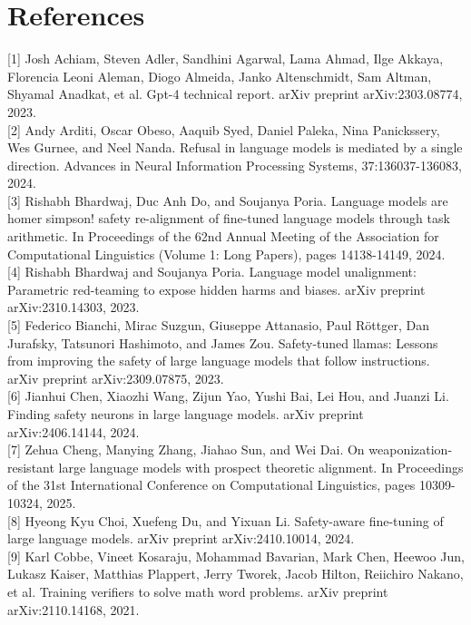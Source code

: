 \documentclass[10pt]{article}
\begin{document}
\section*{References}
[1] Josh Achiam, Steven Adler, Sandhini Agarwal, Lama Ahmad, Ilge Akkaya, Florencia Leoni Aleman, Diogo Almeida, Janko Altenschmidt, Sam Altman, Shyamal Anadkat, et al. Gpt-4 technical report. arXiv preprint arXiv:2303.08774, 2023.\\[0pt]
[2] Andy Arditi, Oscar Obeso, Aaquib Syed, Daniel Paleka, Nina Panickssery, Wes Gurnee, and Neel Nanda. Refusal in language models is mediated by a single direction. Advances in Neural Information Processing Systems, 37:136037-136083, 2024.\\[0pt]
[3] Rishabh Bhardwaj, Duc Anh Do, and Soujanya Poria. Language models are homer simpson! safety re-alignment of fine-tuned language models through task arithmetic. In Proceedings of the 62nd Annual Meeting of the Association for Computational Linguistics (Volume 1: Long Papers), pages 14138-14149, 2024.\\[0pt]
[4] Rishabh Bhardwaj and Soujanya Poria. Language model unalignment: Parametric red-teaming to expose hidden harms and biases. arXiv preprint arXiv:2310.14303, 2023.\\[0pt]
[5] Federico Bianchi, Mirac Suzgun, Giuseppe Attanasio, Paul Röttger, Dan Jurafsky, Tatsunori Hashimoto, and James Zou. Safety-tuned llamas: Lessons from improving the safety of large language models that follow instructions. arXiv preprint arXiv:2309.07875, 2023.\\[0pt]
[6] Jianhui Chen, Xiaozhi Wang, Zijun Yao, Yushi Bai, Lei Hou, and Juanzi Li. Finding safety neurons in large language models. arXiv preprint arXiv:2406.14144, 2024.\\[0pt]
[7] Zehua Cheng, Manying Zhang, Jiahao Sun, and Wei Dai. On weaponization-resistant large language models with prospect theoretic alignment. In Proceedings of the 31st International Conference on Computational Linguistics, pages 10309-10324, 2025.\\[0pt]
[8] Hyeong Kyu Choi, Xuefeng Du, and Yixuan Li. Safety-aware fine-tuning of large language models. arXiv preprint arXiv:2410.10014, 2024.\\[0pt]
[9] Karl Cobbe, Vineet Kosaraju, Mohammad Bavarian, Mark Chen, Heewoo Jun, Lukasz Kaiser, Matthias Plappert, Jerry Tworek, Jacob Hilton, Reiichiro Nakano, et al. Training verifiers to solve math word problems. arXiv preprint arXiv:2110.14168, 2021.\\[0pt]
\end{document}
